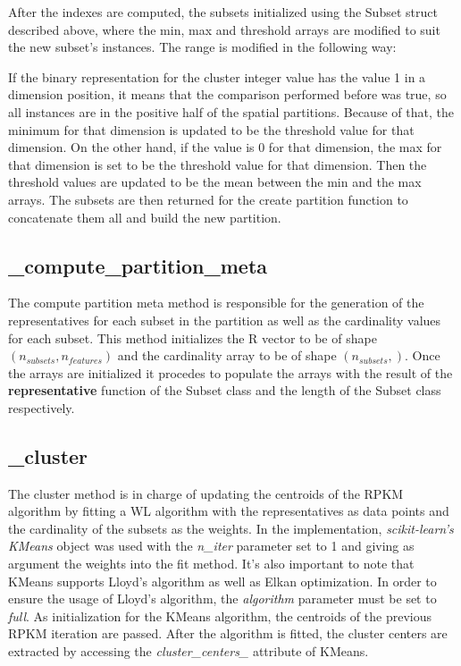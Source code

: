 After the indexes are computed, the subsets initialized using the Subset struct described above, where the min, max and threshold arrays are modified to suit the new subset's instances. The range is modified in the following way:

If the binary representation for the cluster integer value has the value 1 in a dimension position, it means that the comparison performed before was true, so all instances are in the positive half of the spatial partitions. Because of that, the minimum for that dimension is updated to be the threshold value for that dimension. On the other hand, if the value is 0 for that dimension, the max for that dimension is set to be the threshold value for that dimension. Then the threshold values are updated to be the mean between the min and the max arrays. The subsets are then returned for the create partition function to concatenate them all and build the new partition.

\subsection{\_compute\_partition\_meta}

The compute partition meta method is responsible for the generation of the representatives for each subset in the partition as well as the cardinality values for each subset.
This method initializes the R vector to be of shape $(n_{subsets}, n_{features})$ and the cardinality array to be of shape $(n_{subsets}, )$. Once the arrays are initialized it procedes to populate the arrays with the result of the \textbf{representative} function of the Subset class and the length of the Subset class respectively.

\subsection{\_cluster}

The cluster method is in charge of updating the centroids of the RPKM algorithm by fitting a WL algorithm with the representatives as data points and the cardinality of the subsets as the weights. In the implementation, \textit{scikit-learn's KMeans} object was used with the \textit{n\_iter} parameter set to 1 and giving as argument the weights into the fit method. It's also important to note that KMeans supports Lloyd's algorithm as well as Elkan optimization. In order to ensure the usage of Lloyd's algorithm, the \textit{algorithm} parameter must be set to \textit{full}. As initialization for the KMeans algorithm, the centroids of the previous RPKM iteration are passed. After the algorithm is fitted, the cluster centers are extracted by accessing the \textit{cluster\_centers\_} attribute of KMeans.

